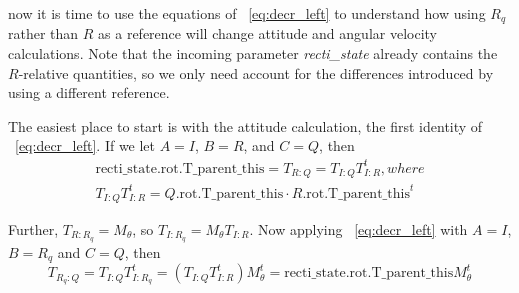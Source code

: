 now it is time to use the equations of ~\ref{eq:decr_left} to understand how
using $R_q$ rather than $R$ as a reference will
change attitude and angular velocity calculations. Note that
the incoming parameter \textit{recti\_state} already contains the $R$-relative
quantities, so we only need account for the differences introduced by using a
different reference.

The easiest place to start is with the attitude calculation, the first
identity of ~\ref{eq:decr_left}. If we let $A = I$, $B = R$, and
$C = Q$, then
\begin{eqnarray}
\mbox{recti\_state.rot.T\_parent\_this} = T_{R:Q} = T_{I:Q}T_{I:R}^t, where \\ \nonumber
T_{I:Q}T_{I:R}^t = Q\mbox{.rot.T\_parent\_this} \cdot R\mbox{.rot.T\_parent\_this}^t
\label{eq:att1}
\end{eqnarray}

Further, $T_{R:R_q} = M_\theta$, 
so $T_{I:R_q} = M_\theta T_{I:R}$. Now applying ~\ref{eq:decr_left} with
$A = I$, $B = R_q$ and $C = Q$, then
\begin{equation}
T_{R_q:Q} = T_{I:Q}T_{I:R_q}^t = (T_{I:Q}T_{I:R}^t)M_\theta^t = 
\mbox{recti\_state.rot.T\_parent\_this}M_\theta^t
\label{eq:att2}
\end{equation}

